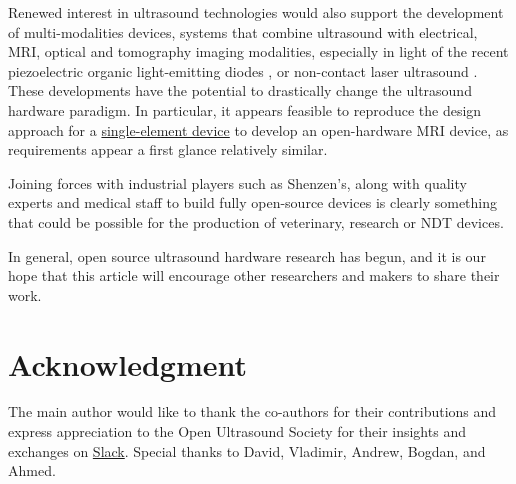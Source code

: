 \documentclass{article}
\begin{document}
Renewed interest in ultrasound technologies would also support the development of multi-modalities devices, systems that combine ultrasound with electrical, MRI, optical and tomography imaging modalities, especially in light of the recent piezoelectric organic light-emitting diodes \cite{yu_direct_2020}, or non-contact laser ultrasound \cite{zhang_full_2019}. These developments have the potential to drastically change the ultrasound hardware paradigm. In particular, it appears feasible to reproduce the design approach for a \href{http://un0rick.cc}{single-element device} to develop an open-hardware MRI device, as requirements appear a first glance relatively similar.

Joining forces with industrial players such as Shenzen's, along with quality experts and medical staff to build fully open-source devices is clearly something that could be possible for the production of veterinary, research or NDT devices.

In general, open source ultrasound hardware research \cite{roman_open-source_2019} has begun, and it is our hope that this article will encourage other researchers and makers to share their work. 

\section*{Acknowledgment}

The main author would like to thank the co-authors for their contributions and express appreciation to the Open Ultrasound Society for their insights and exchanges on \href{https://join.slack.com/t/usdevkit/shared_invite/zt-2g501obl-z53YHyGOOMZjeCXuXzjZow}{Slack}. Special thanks to David, Vladimir, Andrew, Bogdan, and Ahmed.

\clearpage



  
\end{document}
